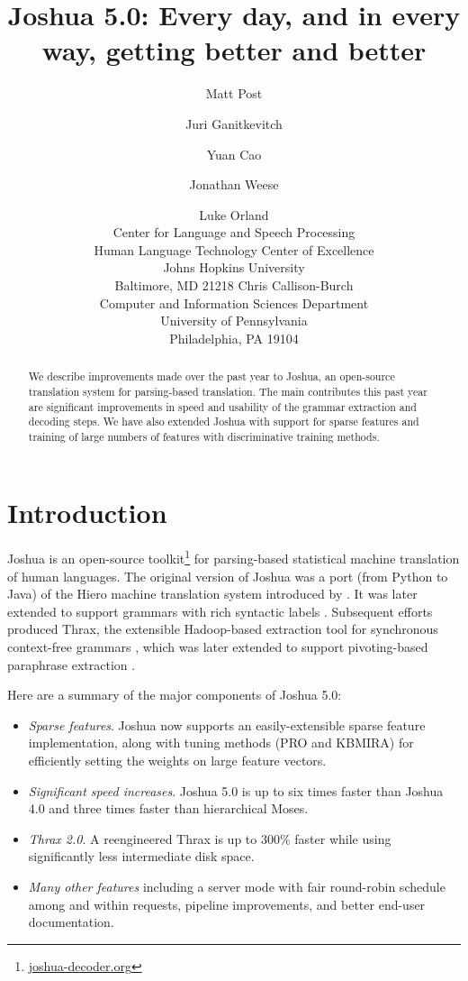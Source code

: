 \documentclass[11pt]{article}
\title{Joshua 5.0: Every day, and in every way, getting better and better}
\author{Matt Post\hltcoe \and Juri Ganitkevitch\clsp \and Yuan Cao\clsp \and Jonathan Weese\clsp 
  \and Luke Orland\hltcoe \\
  \clsp Center for Language and Speech Processing \\
  \hltcoe Human Language Technology Center of Excellence \\
  Johns Hopkins University \\
  Baltimore, MD 21218
  \AND  Chris Callison-Burch \\
  Computer and Information Sciences Department \\
  University of Pennsylvania \\
  Philadelphia, PA 19104
}
\date{}
\begin{document}
\maketitle

\begin{abstract}
  We describe improvements made over the past year to Joshua, an
  open-source translation system for parsing-based translation. The
  main contributes this past year are significant improvements in
  speed and usability of the grammar extraction and decoding steps. We
  have also extended Joshua with support for sparse features and
  training of large numbers of features with discriminative training
  methods.
\end{abstract}

\section{Introduction}
\label{sec-intro}

Joshua is an open-source toolkit\footnote{\url{joshua-decoder.org}}
for parsing-based statistical machine translation of human languages.
The original version of Joshua \cite{Joshua-WMT} was a port (from
Python to Java) of the Hiero machine translation system introduced by
.  It was later extended to support grammars with
rich syntactic labels \cite{li2010joshua}. Subsequent efforts produced
Thrax, the extensible Hadoop-based extraction tool for synchronous
context-free grammars \cite{Joshua-3.0}, which was later extended to
support pivoting-based paraphrase extraction \cite{Joshua-4.0}.

Here are a summary of the major components of Joshua 5.0:

\begin{itemize}
  \item \emph{Sparse features}. Joshua now supports an
    easily-extensible sparse feature implementation, along with tuning
    methods (PRO and KBMIRA) for efficiently setting the weights on
    large feature vectors.
  \item \emph{Significant speed increases}. Joshua 5.0 is up to six
    times faster than Joshua 4.0 and three times faster than
    hierarchical Moses.
  \item \emph{Thrax 2.0}. A reengineered Thrax is up to 300\% faster
    while using significantly less intermediate disk space.
  \item \emph{Many other features} including a server mode with fair
    round-robin schedule among and within requests, pipeline
    improvements, and better end-user documentation.
\end{itemize}
\end{document}
